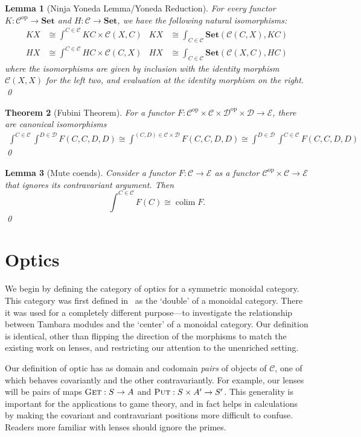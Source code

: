 \documentclass[11pt,letterpaper]{article}
\theoremstyle{plain}
\newtheorem{theorem}{Theorem}[subsection]
\newtheorem{lemma}[theorem]{Lemma}
\theoremstyle{definition}
\newcommand{\C}{\mathscr{C}}
\newcommand{\D}{\mathscr{D}}
\newcommand{\E}{\mathscr{E}}
\newcommand{\Set}{\mathbf{Set}}
\newcommand{\op}{\mathrm{op}}
\DeclareMathOperator*{\colim}{\mathrm{colim}}
\newcommand{\fget}{\textsc{Get}}
\newcommand{\fput}{\textsc{Put}}
\begin{document}
\begin{lemma}[Ninja Yoneda Lemma/Yoneda Reduction]\label{lem:yoneda-reduction}
For every functor $K : \C^\op \to \Set$ and $H : \C \to \Set$, we have the following natural isomorphisms:
\begin{align*}
KX &\cong \int^{C \in \C} KC \times \C(X,C) &
KX &\cong \int_{C \in \C} \Set(\C(C,X), KC) \\
HX &\cong \int^{C \in \C} HC \times \C(C,X)  &
HX &\cong \int_{C \in \C} \Set(\C(X,C), HC)
\end{align*}
where the isomorphisms are given by inclusion with the identity morphism $\C(X, X)$ for the left two, and evaluation at the identity morphism on the right.
\qed
\end{lemma}

\begin{theorem}[Fubini Theorem]
For a functor $F : \C^\op \times \C \times \D^\op \times \D \to \E$, there are canonical isomorphisms
\begin{align*}
\int^{C \in \C} \int^{D \in \D} F(C,C,D,D) \cong \int^{(C,D) \in \C \times \D} F(C,C,D,D) \cong \int^{D \in \D} \int^{C \in \C} F(C,C,D,D)
\end{align*}
\qed
\end{theorem}

\begin{lemma}[Mute coends]
Consider a functor $F : \C \to \E$ as a functor $\C^\op \times \C \to \E$ that ignores its contravariant argument. Then \[ \int^{C \in \C} F(C) \cong \colim F. \] \qed
\end{lemma}

\section{Optics}\label{sec:optics}

We begin by defining the category of optics for a symmetric monoidal category. This category was first defined in~\cite[Section 6]{Doubles} as the `double' of a monoidal category. There it was used for a completely different purpose---to investigate the relationship between Tambara modules and the `center' of a monoidal category. Our definition is identical, other than flipping the direction of the morphisms to match the existing work on lenses, and restricting our attention to the unenriched setting.

Our definition of optic has as domain and codomain \emph{pairs} of objects of $\C$, one of which behaves covariantly and the other contravariantly. For example, our lenses will be pairs of maps $\fget : S \to A$ and $\fput : S \times A' \to S'$. This generality is important for the applications to game theory, and in fact helps in calculations by making the covariant and contravariant positions more difficult to confuse. Readers more familiar with lenses should ignore the primes.
\end{document}
